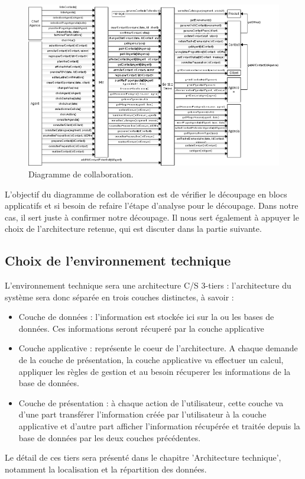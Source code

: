 \begin{figure}[H]
\centering
\includegraphics[angle=90]{diagramme-collaboration.png}
\caption*{Diagramme de collaboration.}
\end{figure}

L'objectif du diagramme de collaboration est de vérifier le découpage en blocs applicatifs et si besoin de refaire l'étape d'analyse pour le découpage. Dans notre cas, il sert juste à confirmer notre découpage. Il nous sert également à appuyer le choix de l'architecture retenue, qui est discuter dans la partie suivante.


\subsection{Choix de l'environnement technique}
L'environnement technique sera une architecture C/S 3-tiers : l'architecture du système sera donc séparée en trois couches distinctes, à savoir :
\begin{itemize}
\item Couche de données : l'information est stockée ici sur la ou les bases de données. Ces informations seront récuperé par la couche applicative
\item Couche applicative : représente le coeur de l'architecture. A chaque demande de la couche de présentation, la couche applicative va effectuer un calcul, appliquer les règles de gestion et au besoin récuperer les informations de la base de données.
\item Couche de présentation : à chaque action de l'utilisateur, cette couche va d'une part transférer l'information créée par l'utilisateur à la couche applicative et d'autre part afficher l'information récupérée et traitée depuis la base de données par les deux couches précédentes.
\end{itemize}
Le détail de ces tiers sera présenté dans le chapitre 'Architecture technique', notamment la localisation et la répartition des données.
